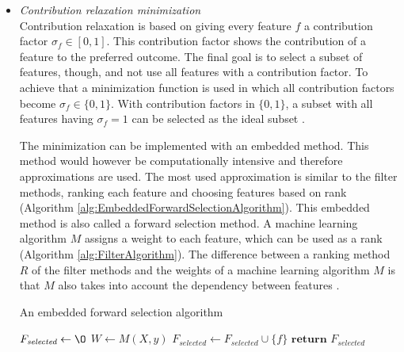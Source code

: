 \documentclass[10pt,a4paper]{report}
\begin{document}
	
	\begin{itemize}
		\item \textit{Contribution relaxation minimization} \\
		
		Contribution relaxation is based on giving every feature $f$ a contribution factor $\sigma_f \in [0, 1]$. This contribution factor shows the contribution of a feature to the preferred outcome. The final goal is to select a subset of features, though, and not use all features with a contribution factor. To achieve that a minimization function is used in which all contribution factors become $\sigma_f \in \{0, 1\}$. With contribution factors in $\{0, 1\}$, a subset with all features having $\sigma_f = 1$ can be selected as the ideal subset \cite{Lal2006}. 
		
		The minimization can be implemented with an embedded method. This method would however be computationally intensive and therefore approximations are used. The most used approximation is similar to the filter methods, ranking each feature and choosing features based on rank (Algorithm \ref{alg:EmbeddedForwardSelectionAlgorithm}). This embedded method is also called a forward selection method. A machine learning algorithm $M$ assigns a weight to each feature, which can be used as a rank (Algorithm \ref{alg:FilterAlgorithm}). The difference between a ranking method $R$ of the filter methods and the weights of a machine learning algorithm $M$ is that $M$ also takes into account the dependency between features \cite{Lal2006}.
		
		\begin{algorithm}[H]
			\caption{An embedded forward selection algorithm \cite{Lal2006}}\label{alg:EmbeddedForwardSelectionAlgorithm}
			\begin{algorithmic}[1]
				\State $F_{\textit{selected}} \gets \O$ 	
				\State $W \gets M(X, y)$					
				 					
							
				\State $F_{\textit{selected}} \gets F_{\textit{selected}} \cup \{f\}$ 
				\EndIf
				\EndFor
				\State $\textbf{return } F_{\textit{selected}}$
				\EndProcedure
			\end{algorithmic}
		\end{algorithm}
		

\end{itemize}
\end{document}
